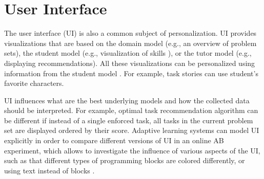 %



\section{User Interface}
\label{sec:user-interface}


The user interface (UI) is also a common subject of personalization. %
UI provides visualizations that are based on
the domain model (e.g., an overview of problem sets),
the student model (e.g., visualization of skills \cite{open-learner-model}),
or the tutor model (e.g., displaying recommendations). %
All these visualizations can be personalized using
information from the student model
\cite[chapter 9]{its-domain-models}.
For example,
task stories can use student's favorite characters. %

UI influences what are the best underlying models
and how the collected data should be interpreted.
For example, optimal task recommendation algorithm can be
different if instead of a single enforced task,
all tasks in the current problem set are displayed ordered by their score.
Adaptive learning systems can model UI explicitly in order to compare different versions
of UI in an online AB experiment,
which allows to investigate the influence of various aspects of
the UI, such as that different types of programming blocks are colored differently,
or using text instead of blocks %
\cite{comparing-blocks-text-weintrop2017}.

